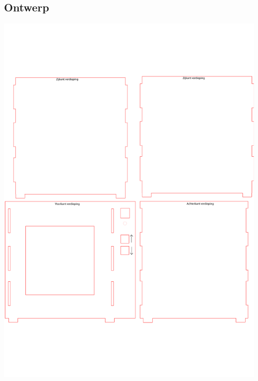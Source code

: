 \subsection{Ontwerp}
\begin{center}
\includegraphics[height=0.6\textheight, angle = 0]{src/ontwerp/verdieping.pdf}

\end{center}
